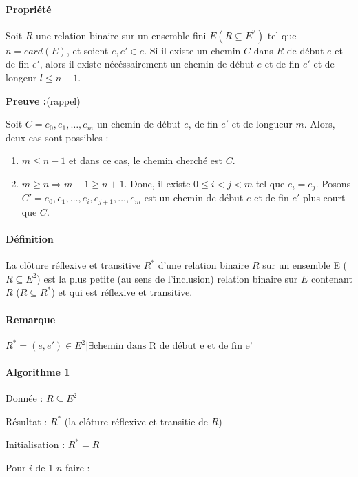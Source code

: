 \documentclass[12pt, a4paper]{report}
\begin{document}
\paragraph{Propriété}
Soit $R$ une relation binaire sur un ensemble fini $E (R\subseteq E^2)$ tel que
$n=card(E)$, et soient 
$e, e'\in e$. Si il existe un chemin $C$ dans $R$ de début $e$ et de fin $e'$,
alors il existe 
nécéssairement un chemin de début $e$ et de fin $e'$ et de longeur $l \leq n-1$.

\textbf{Preuve :}(rappel)

Soit $C = e_0, e_1, \dots, e_m$ un chemin de début $e$, de fin $e'$ et de
longueur $m$. Alors, 
deux cas sont possibles :

\begin{enumerate}
  \item $m \leq n-1$ et dans ce cas, le chemin cherché est $C$.
  \item $m \geq n \Rightarrow m+1 \geq n+1$. Donc, il existe $0\leq i < j < m$
  tel que $e_i = e_j$.
  Posons $C' = e_0, e_1, \dots, e_i, e_{j+1}, \dots, e_m$ est un chemin de
  début $e$ et de fin $e'$
  plus court que $C$.
\end{enumerate}

\paragraph{Définition}

La clôture réflexive et transitive $R^{*}$ d'une relation binaire $R$ sur un ensemble E
($R \subseteq E^2$) est la plus petite (au sens de l'inclusion) relation binaire sur $E$ contenant
$R$ ($R \subseteq R^{*}$) et qui est réflexive et transitive.

\paragraph{Remarque} $R^{*} = { (e, e') \in E^{2} | \exists \textrm {chemin dans R de début e et de fin e'}}$

\paragraph{Algorithme 1}
Donnée : $R \subseteq E^2$

Résultat : $R^{*}$ (la clôture réflexive et transitie de $R$)

Initialisation : $R^{*} = R$

Pour $i$ de 1  $n$ faire :
\end{document}
